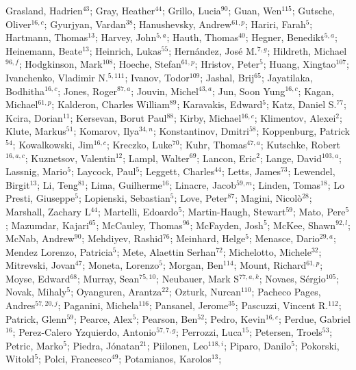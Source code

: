 Grasland, Hadrien$^{43}$;
Gray, Heather$^{44}$;
Grillo, Lucia$^{90}$;
Guan, Wen$^{115}$;
Gutsche, Oliver$^{16,c}$;
Gyurjyan, Vardan$^{38}$;
Hanushevsky, Andrew$^{61,p}$;
Hariri, Farah$^{5}$;
Hartmann, Thomas$^{13}$;
Harvey, John$^{5,a}$;
Hauth, Thomas$^{40}$;
Hegner, Benedikt$^{5,a}$;
Heinemann, Beate$^{13}$;
Heinrich, Lukas$^{55}$;
Hernández, José M.$^{7,g}$;
Hildreth, Michael$^{96,f}$;
Hodgkinson, Mark$^{108}$;
Hoeche, Stefan$^{61,p}$;
Hristov, Peter$^{5}$;
Huang, Xingtao$^{107}$;
Ivanchenko, Vladimir N.$^{5,111}$;
Ivanov, Todor$^{109}$;
Jashal, Brij$^{65}$;
Jayatilaka, Bodhitha$^{16,c}$;
Jones, Roger$^{87,a}$;
Jouvin, Michel$^{43,a}$;
Jun, Soon Yung$^{16,c}$;
Kagan, Michael$^{61,p}$;
Kalderon, Charles William$^{89}$;
Karavakis, Edward$^{5}$;
Katz, Daniel S.$^{77}$;
Kcira, Dorian$^{11}$;
Kersevan, Borut Paul$^{88}$;
Kirby, Michael$^{16,c}$;
Klimentov, Alexei$^{2}$;
Klute, Markus$^{51}$;
Komarov, Ilya$^{34,n}$;
Konstantinov, Dmitri$^{58}$;
Koppenburg, Patrick$^{54}$;
Kowalkowski, Jim$^{16,c}$;
Kreczko, Luke$^{70}$;
Kuhr, Thomas$^{47,a}$;
Kutschke, Robert$^{16,a,c}$;
Kuznetsov, Valentin$^{12}$;
Lampl, Walter$^{69}$;
Lancon, Eric$^{2}$;
Lange, David$^{103,a}$;
Lassnig, Mario$^{5}$;
Laycock, Paul$^{5}$;
Leggett, Charles$^{44}$;
Letts, James$^{73}$;
Lewendel, Birgit$^{13}$;
Li, Teng$^{81}$;
Lima, Guilherme$^{16}$;
Linacre, Jacob$^{59,m}$;
Linden, Tomas$^{18}$;
Lo Presti, Giuseppe$^{5}$;
Lopienski, Sebastian$^{5}$;
Love, Peter$^{87}$;
Magini, Nicolò$^{28}$;
Marshall, Zachary L$^{44}$;
Martelli, Edoardo$^{5}$;
Martin-Haugh, Stewart$^{59}$;
Mato, Pere$^{5}$;
Mazumdar, Kajari$^{65}$;
McCauley, Thomas$^{96}$;
McFayden, Josh$^{5}$;
McKee, Shawn$^{92,l}$;
McNab, Andrew$^{90}$;
Mehdiyev, Rashid$^{76}$;
Meinhard, Helge$^{5}$;
Menasce, Dario$^{29,a}$;
Mendez Lorenzo, Patricia$^{5}$;
Mete, Alaettin Serhan$^{72}$;
Michelotto, Michele$^{32}$;
Mitrevski, Jovan$^{47}$;
Moneta, Lorenzo$^{5}$;
Morgan, Ben$^{114}$;
Mount, Richard$^{61,p}$;
Moyse, Edward$^{68}$;
Murray, Sean$^{75,10}$;
Neubauer, Mark S$^{77,a,k}$;
Novaes, Sérgio$^{105}$;
Novak, Mihaly$^{5}$;
Oyanguren, Arantza$^{22}$;
Ozturk, Nurcan$^{110}$;
Pacheco Pages, Andres$^{57,20,j}$;
Paganini, Michela$^{116}$;
Pansanel, Jerome$^{35}$;
Pascuzzi, Vincent R.$^{112}$;
Patrick, Glenn$^{59}$;
Pearce, Alex$^{5}$;
Pearson, Ben$^{52}$;
Pedro, Kevin$^{16,c}$;
Perdue, Gabriel$^{16}$;
Perez-Calero Yzquierdo, Antonio$^{57,7,g}$;
Perrozzi, Luca$^{15}$;
Petersen, Troels$^{53}$;
Petric, Marko$^{5}$;
Piedra, Jónatan$^{21}$;
Piilonen, Leo$^{118,i}$;
Piparo, Danilo$^{5}$;
Pokorski, Witold$^{5}$;
Polci, Francesco$^{49}$;
Potamianos, Karolos$^{13}$;

